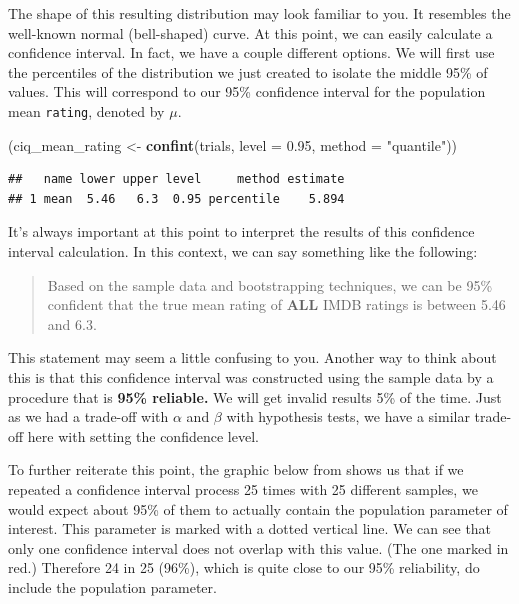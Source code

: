 \documentclass[]{tufte-book}
\newenvironment{Shaded}{\begin{snugshade}}{\end{snugshade}}
\newcommand{\KeywordTok}[1]{\textcolor[rgb]{0.13,0.29,0.53}{\textbf{{#1}}}}
\newcommand{\DataTypeTok}[1]{\textcolor[rgb]{0.13,0.29,0.53}{{#1}}}
\newcommand{\FloatTok}[1]{\textcolor[rgb]{0.00,0.00,0.81}{{#1}}}
\newcommand{\StringTok}[1]{\textcolor[rgb]{0.31,0.60,0.02}{{#1}}}
\newcommand{\NormalTok}[1]{{#1}}
\begin{document}
The shape of this resulting distribution may look familiar to you. It
resembles the well-known normal (bell-shaped) curve. At this point, we
can easily calculate a confidence interval. In fact, we have a couple
different options. We will first use the percentiles of the distribution
we just created to isolate the middle 95\% of values. This will
correspond to our 95\% confidence interval for the population mean
\texttt{rating}, denoted by \(\mu\).

\begin{Shaded}
\begin{Highlighting}[]
\NormalTok{(ciq_mean_rating <-}\StringTok{ }\KeywordTok{confint}\NormalTok{(trials, }\DataTypeTok{level =} \FloatTok{0.95}\NormalTok{, }\DataTypeTok{method =} \StringTok{"quantile"}\NormalTok{))}
\end{Highlighting}
\end{Shaded}

\begin{verbatim}
##   name lower upper level     method estimate
## 1 mean  5.46   6.3  0.95 percentile    5.894
\end{verbatim}

It's always important at this point to interpret the results of this
confidence interval calculation. In this context, we can say something
like the following:

\begin{quote}
Based on the sample data and bootstrapping techniques, we can be 95\%
confident that the true mean rating of \textbf{ALL} IMDB ratings is
between 5.46 and 6.3.
\end{quote}

This statement may seem a little confusing to you. Another way to think
about this is that this confidence interval was constructed using the
sample data by a procedure that is \textbf{95\% reliable.} We will get
invalid results 5\% of the time. Just as we had a trade-off with
\(\alpha\) and \(\beta\) with hypothesis tests, we have a similar
trade-off here with setting the confidence level.

To further reiterate this point, the graphic below from \citet{isrs2014}
shows us that if we repeated a confidence interval process 25 times with
25 different samples, we would expect about 95\% of them to actually
contain the population parameter of interest. This parameter is marked
with a dotted vertical line. We can see that only one confidence
interval does not overlap with this value. (The one marked in red.)
Therefore 24 in 25 (96\%), which is quite close to our 95\% reliability,
do include the population parameter.
\end{document}
